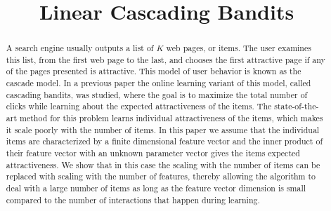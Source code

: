 \documentclass{article}
\title{Linear Cascading Bandits}
\author{}
\begin{document}
\maketitle

\begin{abstract}
A search engine usually outputs a list of $K$ web pages, or items.
The user examines this list, from the first web page to the last, and chooses
the first attractive page if any of the pages presented is attractive.
This model of user behavior is known as the cascade model.
In a previous paper the online learning variant of this model, called cascading bandits, was studied, where
the goal is to maximize the total number of clicks while learning about the expected attractiveness of the items.
The state-of-the-art method for this problem learns individual attractiveness of the items, which makes it scale
poorly with the number of items.
In this paper we assume that the individual items are characterized by a finite dimensional feature vector and the inner
product of their feature vector with an unknown parameter vector gives the items expected attractiveness.
We show that in this case the scaling with the number of items can be replaced with scaling with the number of features,
thereby allowing the algorithm to deal with a large number of items as long as the feature vector dimension is small
compared to the number of interactions that happen during learning.
\end{abstract}























\end{document}

